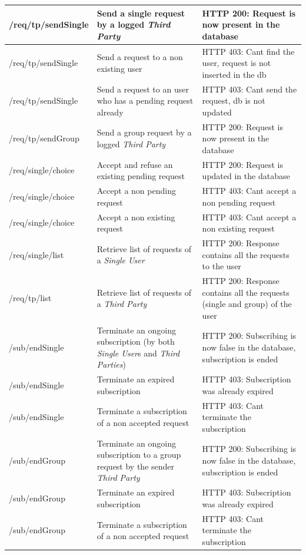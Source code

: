 \documentclass[titlepage]{article}
\begin{document}
\begin{longtable}{| p{3 cm} | p{4 cm} | p{4 cm} |}
		/req/tp/sendSingle & Send a single request by a logged {\it Third Party} & HTTP 200: Request is now present in the database \\ \hline
		/req/tp/sendSingle & Send a request to a non existing user & HTTP 403: Can\textsc{\char13}t find the user, request is not inserted in the db \\ \hline
		/req/tp/sendSingle & Send a request to an user who has a pending request already & HTTP 403: Can\textsc{\char13}t send the request, db is not updated \\ \hline
		/req/tp/sendGroup & Send a group request by a logged {\it Third Party} & HTTP 200: Request is now present in the database \\ \hline
		/req/single/choice & Accept and refuse an existing pending request & HTTP 200: Request is updated in the database \\ \hline
		/req/single/choice & Accept a non pending request & HTTP 403: Can\textsc{\char13}t accept a non pending request \\ \hline
		/req/single/choice & Accept a non existing request & HTTP 403: Can\textsc{\char13}t accept a non existing request \\ \hline
		/req/single/list & Retrieve list of requests of a {\it Single User} & HTTP 200: Response contains all the requests to the user \\ \hline
		/req/tp/list & Retrieve list of requests of a {\it Third Party} & HTTP 200: Response contains all the requests (single and group) of the user \\ \hline
		/sub/endSingle & Terminate an ongoing subscription (by both {\it Single User}s and {\it Third Parties}) & HTTP 200: Subscribing is now false in the database, subscription is ended \\ \hline
		/sub/endSingle & Terminate an expired subscription & HTTP 403: Subscription was already expired \\ \hline
		/sub/endSingle & Terminate a subscription of a non accepted request & HTTP 403: Can\textsc{\char13}t terminate the subscription \\ \hline
		/sub/endGroup & Terminate an ongoing subscription to a group request by the sender {\it Third Party} & HTTP 200: Subscribing is now false in the database, subscription is ended \\ \hline
		/sub/endGroup & Terminate an expired subscription & HTTP 403: Subscription was already expired \\ \hline
		/sub/endGroup & Terminate a subscription of a non accepted request & HTTP 403: Can\textsc{\char13}t terminate the subscription \\ \hline

\end{longtable}
\end{document}
